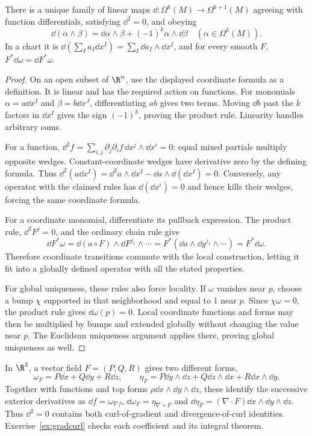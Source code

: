 \begin{theorem}\label{thm:extd}
There is a unique family of linear maps $\dd:\Omega^k(M)\to\Omega^{k+1}(M)$ agreeing with function differentials, satisfying $\dd^2=0$, and obeying
\[
\dd(\alpha\wedge\beta)=\dd\alpha\wedge\beta+(-1)^k\alpha\wedge\dd\beta
\quad(\alpha\in\Omega^k(M)).
\]
In a chart it is $\dd(\sum_Ia_I\dd x^I)=\sum_I\dd a_I\wedge\dd x^I$, and for every smooth $F$, $F^*\dd\omega=\dd F^*\omega$.
\end{theorem}

\begin{proof}
On an open subset of $\R^n$, use the displayed coordinate formula as a definition. It is linear and has the required action on functions. For monomials $\alpha=a\dd x^I$ and $\beta=b\dd x^J$, differentiating $ab$ gives two terms. Moving $\dd b$ past the $k$ factors in $\dd x^I$ gives the sign $(-1)^k$, proving the product rule. Linearity handles arbitrary sums.

For a function, $\dd^2f=\sum_{i,j}\partial_j\partial_if\,\dd x^j\wedge\dd x^i=0$: equal mixed partials multiply opposite wedges. Constant-coordinate wedges have derivative zero by the defining formula. Thus $\dd^2(a\dd x^I)=\dd^2a\wedge\dd x^I-\dd a\wedge\dd(\dd x^I)=0$. Conversely, any operator with the claimed rules has $\dd(\dd x^i)=0$ and hence kills their wedges, forcing the same coordinate formula.

For a coordinate monomial, differentiate its pullback expression. The product rule, $\dd^2F^j=0$, and the ordinary chain rule give
\[
\dd F^*\omega=\dd(a\circ F)\wedge\dd F^{j_1}\wedge\cdots
=F^*(\dd a\wedge\dd y^{j_1}\wedge\cdots)=F^*\dd\omega.
\]
Therefore coordinate transitions commute with the local construction, letting it fit into a globally defined operator with all the stated properties.

For global uniqueness, these rules also force locality. If $\omega$ vanishes near $p$, choose a bump $\chi$ supported in that neighborhood and equal to $1$ near $p$. Since $\chi\omega=0$, the product rule gives $\dd\omega(p)=0$. Local coordinate functions and forms may then be multiplied by bumps and extended globally without changing the value near $p$. The Euclidean uniqueness argument applies there, proving global uniqueness as well.
\end{proof}

\begin{example}\label{ex:gradcurldiv}
In $\R^3$, a vector field $F=(P,Q,R)$ gives two different forms,
\[
\omega_F=P\dd x+Q\dd y+R\dd z,\qquad
\eta_F=P\dd y\wedge\dd z+Q\dd z\wedge\dd x+R\dd x\wedge\dd y.
\]
Together with functions and top forms $\rho\dd x\wedge\dd y\wedge\dd z$, these identify the successive exterior derivatives as
$\dd f=\omega_{\nabla f}$, $\dd\omega_F=\eta_{\nabla\times F}$ and $\dd\eta_F=(\nabla\cdot F)\dd x\wedge\dd y\wedge\dd z$. Thus $\dd^2=0$ contains both curl-of-gradient and divergence-of-curl identities. Exercise~\ref{ex:gradcurl} checks each coefficient and its integral theorem.
\end{example}

